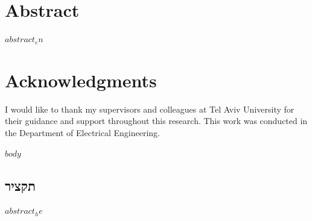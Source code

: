 \documentclass[12pt,a4paper,oneside]{report}
\theoremstyle{definition}
\begin{document}
\chapter*{Abstract}

$abstract_en$

\chapter*{Acknowledgments}

I would like to thank my supervisors and colleagues at Tel Aviv University for their guidance and support throughout this research. This work was conducted in the Department of Electrical Engineering.

\tableofcontents
\clearpage

\listoffigures
{}
\clearpage

\listoftables
{}
\clearpage

\mainmatter
{}

$body$

\backmatter
\clearpage
\begin{flushright}
\chapter*{\texthebrew{תקציר}}
\end{flushright}

$abstract_he$
\end{document}
